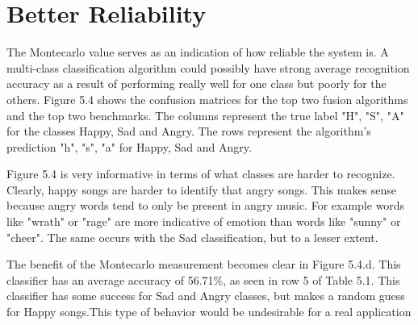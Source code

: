 \section*{Better Reliability}

The Montecarlo value serves as an indication of how reliable the system is. 
A multi-class classification algorithm could possibly have strong average 
recognition accuracy as a result  of performing really well for one class but 
poorly for the others. Figure 5.4 shows the confusion matrices for the top 
two fusion algorithms and the top two benchmarks. The columns represent 
the true label "H", "S", "A" for the classes Happy, Sad and Angry. The rows 
represent the algorithm's prediction "h", "s", "a" for Happy, Sad and Angry.

Figure 5.4 is very informative in terms of what classes are harder to recognize. 
Clearly, happy songs are harder to identify that angry songs. This makes 
sense because angry words tend to only be present in angry music. For example 
words like "wrath" or "rage" are more indicative of emotion than words like "sunny" or "cheer".
 The same occurs with the Sad classification, but to a lesser extent. 

The benefit of the Montecarlo measurement becomes clear in Figure 5.4.d. 
This classifier has an average accuracy of 56.71\%, as seen in row 5 of 
Table 5.1. This classifier has some success for Sad and Angry classes, but 
makes a random guess for Happy songs.This type of behavior 
would be undesirable for a real application  

